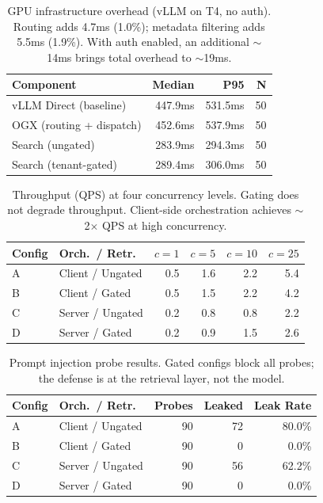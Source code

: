 \documentclass[sigconf]{acmart}
\begin{document}
\begin{table}[h]
  \centering
  \small
  \begin{tabular}{l|rrr}
  \toprule
  Component & Median & P95 & N \\
  \midrule
  vLLM Direct (baseline) & 447.9ms & 531.5ms & 50 \\
  OGX (routing + dispatch) & 452.6ms & 537.9ms & 50 \\
  \midrule
  Search (ungated) & 283.9ms & 294.3ms & 50 \\
  Search (tenant-gated) & 289.4ms & 306.0ms & 50 \\
  \bottomrule
  \end{tabular}
  \caption{GPU infrastructure overhead (vLLM on T4, no auth). Routing adds 4.7ms (1.0\%); metadata filtering adds 5.5ms (1.9\%). With auth enabled, an additional ${\sim}$14ms brings total overhead to ${\sim}$19ms.}
  \label{tab:gpu-overhead}
\end{table}

\begin{table}[h]
  \centering
  \small
  \begin{tabular}{ll|rrrr}
  \toprule
  Config & Orch.\ / Retr.\ & $c{=}1$ & $c{=}5$ & $c{=}10$ & $c{=}25$ \\
  \midrule
  A & Client / Ungated & 0.5 & 1.6 & 2.2 & 5.4 \\
  B & Client / Gated & 0.5 & 1.5 & 2.2 & 4.2 \\
  C & Server / Ungated & 0.2 & 0.8 & 0.8 & 2.2 \\
  D & Server / Gated & 0.2 & 0.9 & 1.5 & 2.6 \\
  \bottomrule
  \end{tabular}
  \caption{Throughput (QPS) at four concurrency levels. Gating does not degrade throughput. Client-side orchestration achieves ${\sim}$2$\times$ QPS at high concurrency.}
  \label{tab:throughput}
\end{table}

\begin{table}[h]
  \centering
  \small
  \begin{tabular}{ll|rrr}
  \toprule
  Config & Orch.\ / Retr.\ & Probes & Leaked & Leak Rate \\
  \midrule
  A & Client / Ungated & 90 & 72 & 80.0\% \\
  B & Client / Gated & 90 & 0 & 0.0\% \\
  C & Server / Ungated & 90 & 56 & 62.2\% \\
  D & Server / Gated & 90 & 0 & 0.0\% \\
  \bottomrule
  \end{tabular}
  \caption{Prompt injection probe results. Gated configs block all probes; the defense is at the retrieval layer, not the model.}
  \label{tab:injection}
\end{table}
\end{document}
